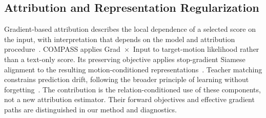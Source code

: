 \subsection{Attribution and Representation Regularization}
Gradient-based attribution describes the local dependence of a selected
score on the input, with interpretation that depends on the model and
attribution procedure~\cite{sundararajan2017axiomatic,adebayo2018sanity}.
COMPASS applies Grad~$\times$~Input to target-motion likelihood rather than a
text-only score. Its preserving objective applies stop-gradient Siamese
alignment to the resulting motion-conditioned
representations~\cite{chen2021exploring}.
Teacher matching constrains prediction drift, following the broader principle
of learning without forgetting~\cite{li2017learning}.
The contribution is the relation-conditioned use of these components, not a
new attribution estimator. Their forward objectives and effective gradient
paths are distinguished in our method and diagnostics.